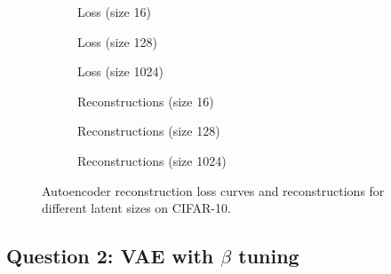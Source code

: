 \documentclass[11pt]{article}
\begin{document}
\begin{figure}[H]
  \centering
  \begin{subfigure}[b]{0.3\textwidth}
    \centering
    \fbox{\rule{0pt}{3cm}\rule{0.9\textwidth}{0pt}}
    \caption{Loss (size 16)}
  \end{subfigure}
  \hfill
  \begin{subfigure}[b]{0.3\textwidth}
    \centering
    \fbox{\rule{0pt}{3cm}\rule{0.9\textwidth}{0pt}}
    \caption{Loss (size 128)}
  \end{subfigure}
  \hfill
  \begin{subfigure}[b]{0.3\textwidth}
    \centering
    \fbox{\rule{0pt}{3cm}\rule{0.9\textwidth}{0pt}}
    \caption{Loss (size 1024)}
  \end{subfigure}

  \vspace{0.5em}

  \begin{subfigure}[b]{0.3\textwidth}
    \centering
    \fbox{\rule{0pt}{3cm}\rule{0.9\textwidth}{0pt}}
    \caption{Reconstructions (size 16)}
  \end{subfigure}
  \hfill
  \begin{subfigure}[b]{0.3\textwidth}
    \centering
    \fbox{\rule{0pt}{3cm}\rule{0.9\textwidth}{0pt}}
    \caption{Reconstructions (size 128)}
  \end{subfigure}
  \hfill
  \begin{subfigure}[b]{0.3\textwidth}
    \centering
    \fbox{\rule{0pt}{3cm}\rule{0.9\textwidth}{0pt}}
    \caption{Reconstructions (size 1024)}
  \end{subfigure}
  \caption{Autoencoder reconstruction loss curves and reconstructions for different latent sizes on CIFAR-10.}
\end{figure}

\subsection*{Question 2: VAE with $\beta$ tuning}
\end{document}
